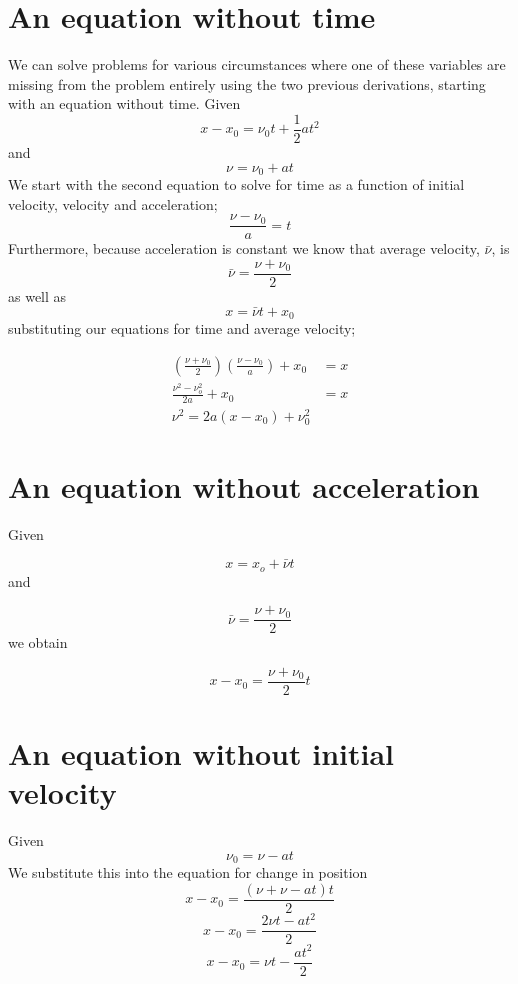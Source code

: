 \documentclass{article}
\begin{document}
\section*{An equation without time}
We can solve problems for various circumstances where one of these variables are missing from the problem entirely using the two previous derivations, starting with an equation without time. Given
\[
	x - x_0 = \nu_0 t + \frac{1}{2} at^2
\]
and
\[
	\nu = \nu_0 + at
\]
We start with the second equation to solve for time as a function of initial velocity, velocity and acceleration;
\[
	\frac{\nu - \nu_0}{a} = t
\]
Furthermore, because acceleration is constant we know that average velocity, $\bar{\nu}$, is
\[
	\bar{\nu} = \frac{\nu + \nu_0}{2}
\]
as well as
\[
	x = \bar{\nu}t + x_0
\]
substituting our equations for time and average velocity;

\begin{align*}
	\left( \frac{\nu + \nu_0}{2} \right) \left( \frac{\nu - \nu_0}{a} \right) + x_0 &= x \\
	\frac{\nu^2 - \nu_o^2}{2a} + x_0 &= x \\
	\nu^2 = 2a \left( x - x_0 \right) + \nu_0^2
\end{align*}

\section*{An equation without acceleration}
Given

\[
	x = x_o + \bar{\nu}t
\]
and

\[
	\bar{\nu} = \frac{\nu + \nu_0}{2}
\]
we obtain

\[
	x - x_0 = \frac{\nu + \nu_0}{2} t
\]

\section*{An equation without initial velocity}
Given
\[
	\nu_0 = \nu - at
\]
We substitute this into the equation for change in position
\[
	x - x_0 = \frac{\left( \nu + \nu - at \right) t}{2}
\]
\[
	x - x_0 = \frac{2\nu t - at^2}{2}
\]
\[
	x - x_0 = \nu t - \frac{at^2}{2}
\]
\end{document}
